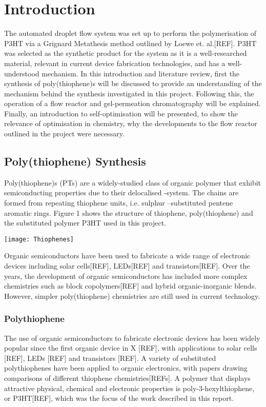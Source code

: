 \chapter{Introduction}

The automated droplet flow system was set up to perform the polymerisation of P3HT via a Grignard Metathesis method outlined by Loewe et. al.[REF]. P3HT was selected as the synthetic product for the system as it is a well-researched material, relevant in current device fabrication technologies, and has a well-understood mechanism. In this introduction and literature review, first the synthesis of poly(thiophene)s will be discussed to provide an understanding of the mechanism behind the synthesis investigated in this project. Following this, the operation of a flow reactor and gel-permeation chromatography will be explained. Finally, an introduction to self-optimisation will be presented, to show the relevance of optimisation in chemistry, why the developments to the flow reactor outlined in the project were necessary.

\section{Poly(thiophene) Synthesis}
Poly(thiophene)s (PTs) are a widely-studied class of organic polymer that exhibit semiconducting properties due to their delocalised -system. The chains are formed from repeating thiophene units, i.e. sulphur –substituted pentene aromatic rings. Figure 1 shows the structure of thiophene, poly(thiophene) and the substituted polymer P3HT used in this project.

\texttt{[image: Thiophenes]}

Organic semiconductors have been used to fabricate a wide range of electronic devices including solar cells[REF], LEDs[REF] and transistors[REF]. Over the years, the development of organic semiconductors has included more complex chemistries such as block copolymers[REF] and hybrid organic-inorganic blends. However, simpler poly(thiophene) chemistries are still used in current technology.

\subsection{Polythiophene}

The use of organic semiconductors to fabricate electronic devices has been widely popular since the first organic device in X [REF], with applications to solar cells [REF], LEDs [REF] and transistors [REF]. A variety of substituted polythiophenes have been applied to organic electronics, with papers drawing comparisons of different thiophene chemistries[REFs]. A polymer that displays attractive physical, chemical and electronic properties is poly-3-hexylthiophene, or P3HT[REF], which was the focus of the work described in this report. 

